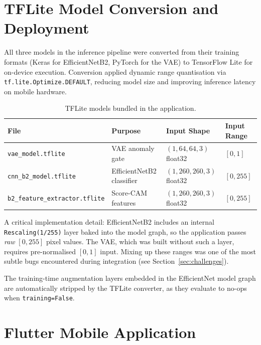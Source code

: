 \section{TFLite Model Conversion and Deployment}
\label{sec:tflite}

All three models in the inference pipeline were converted from their training formats (Keras for EfficientNetB2, PyTorch for the VAE) to TensorFlow Lite for on-device execution. Conversion applied dynamic range quantisation via \texttt{tf.lite.Optimize.DEFAULT}, reducing model size and improving inference latency on mobile hardware.

\begin{table}[H]
\centering
\caption{TFLite models bundled in the application.}
\label{tab:tflite_models}
\begin{tabular}{|l|l|l|l|}
\hline
\textbf{File} & \textbf{Purpose} & \textbf{Input Shape} & \textbf{Input Range} \\ \hline
\texttt{vae\_model.tflite} & VAE anomaly gate & $(1, 64, 64, 3)$ float32 & $[0, 1]$ \\ \hline
\texttt{cnn\_b2\_model.tflite} & EfficientNetB2 classifier & $(1, 260, 260, 3)$ float32 & $[0, 255]$ \\ \hline
\texttt{b2\_feature\_extractor.tflite} & Score-CAM features & $(1, 260, 260, 3)$ float32 & $[0, 255]$ \\ \hline
\end{tabular}
\end{table}

A critical implementation detail: EfficientNetB2 includes an internal \texttt{Rescaling(1/255)} layer baked into the model graph, so the application passes \textit{raw} $[0, 255]$ pixel values. The VAE, which was built without such a layer, requires pre-normalised $[0, 1]$ input. Mixing up these ranges was one of the most subtle bugs encountered during integration (see Section~\ref{sec:challenges}).

The training-time augmentation layers embedded in the EfficientNet model graph are automatically stripped by the TFLite converter, as they evaluate to no-ops when \texttt{training=False}.


\section{Flutter Mobile Application}
\label{sec:flutter}

